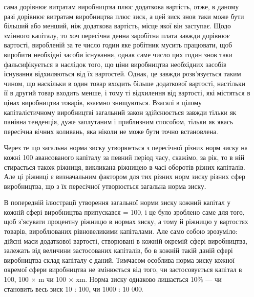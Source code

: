 \parcont{}  %
сама дорівнює витратам виробництва плюс додаткова вартість,
отже, в даному разі дорівнює витратам виробництва плюс зиск,
а цей зиск знов таки може бути більший або менший, ніж додаткова вартість, місце якої він заступає.
Щодо змінного капіталу, то хоч пересічна денна заробітна плата завжди дорівнює вартості, виробленій
за те число годин яке робітник
мусить працювати, щоб виробити необхідні засоби існування,
однак саме число цих годин знов таки фальсифікується в наслідок того, що ціни виробництва необхідних
засобів існування
відхиляються від їх вартостей. Однак, це завжди розв’язується
таким чином, що наскільки в один товар входить більше додаткової вартості, настільки її в другий
товар входить менше,
і тому ті відхилення від вартості, які містяться в цінах виробництва товарів, взаємно знищуються.
Взагалі в цілому капіталістичному виробництві загальний закон здійснюється завжди
тільки як панівна тенденція, дуже заплутаним і приблизним
способом, тільки як якась пересічна вічних коливань, яка ніколи
не може бути точно встановлена.

Через те що загальна норма зиску утворюється з пересічної
різних норм зиску на кожні 100 авансованого капіталу за певний
період часу, скажімо, за рік, то в ній стирається також ріжниця,
викликана ріжницею в часі оборотів різних капіталів. Але ці
ріжниці є визначальним фактором для тих різних норм зиску
різних сфер виробництва, що з їх пересічної утворюється загальна норма зиску.

В попередній ілюстрації утворення загальної норми зиску
кожний капітал у кожній сфері виробництва припускався = 100,
і це було зроблено саме для того, щоб з’ясувати процентну
ріжницю в нормах зиску, а тому й ріжницю у вартостях товарів,
вироблюваних рівновеликими капіталами. Але само собою зрозуміло: дійсні маси додаткової вартості,
створювані в кожній
окремій сфері виробництва, залежать від величини застосованих
капіталів, бо в кожній такій даній сфері виробництва склад капіталу є даний. Тимчасом особлива норма
зиску кожної окремої
сфери виробництва не змінюється від того, чи застосовується
капітал в 100, 100 × m чи 100 × xm. Норма зиску однаково лишається 10\% — чи становить весь зиск 10 :
100, чи 1000 : 10 000.

